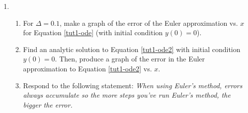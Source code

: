 \begin{enumerate}
			\item
				\begin{enumerate}
					\item For $\Delta=0.1$, make a graph of the error of the Euler approximation vs. $x$ for Equation \eqref{tut1-ode} (with initial condition $y(0)=0$).
					\item Find an analytic solution to Equation \eqref{tut1-ode2} with initial condition $y(0)=0$. Then, produce a graph of the error in the
					Euler approximation to Equation \eqref{tut1-ode2} vs. $x$.
					\item Respond to the following statement: \emph{When using Euler's method, errors always accumulate so the more steps you've run
					Euler's method, the bigger the error.}
				\end{enumerate}

		\end{enumerate}
